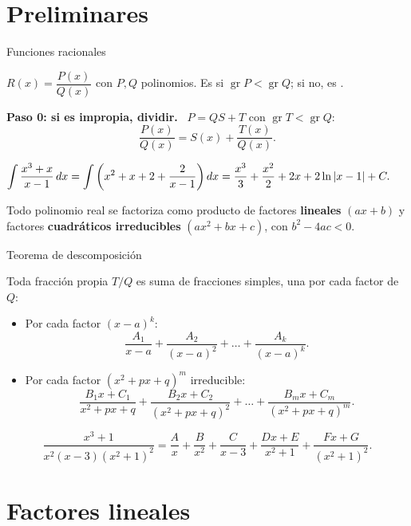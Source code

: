 \documentclass[10pt,aspectratio=169]{beamer}
\begin{document}
\section{Preliminares}

\begin{frame}{Funciones racionales}
  \begin{definicion}
    $R(x)=\dfrac{P(x)}{Q(x)}$ con $P,Q$ polinomios. Es  si $\operatorname{gr}P<\operatorname{gr}Q$; si no, es .
  \end{definicion}
  \textbf{Paso 0: si es impropia, dividir.} \ $P=QS+T$ con $\operatorname{gr}T<\operatorname{gr}Q$:
  \[ \frac{P(x)}{Q(x)}=S(x)+\frac{T(x)}{Q(x)}. \]
  \begin{ejemplo}[1]
    $\displaystyle\int\frac{x^3+x}{x-1}\,dx=\int\left(x^2+x+2+\frac{2}{x-1}\right)dx=\frac{x^3}{3}+\frac{x^2}{2}+2x+2\ln|x-1|+C.$
  \end{ejemplo}
  \begin{teorema}[factorización en $\R$]
    Todo polinomio real se factoriza como producto de factores \textbf{lineales} $(ax+b)$ y factores \textbf{cuadráticos
    irreducibles} $(ax^2+bx+c)$, con $b^2-4ac<0$.
  \end{teorema}
\end{frame}

\begin{frame}{Teorema de descomposición}
  \begin{teorema}
    Toda fracción propia $T/Q$ es suma de fracciones simples, una por cada factor de $Q$:
    \begin{itemize}
      \item Por cada factor $(x-a)^k$:
        \[ \frac{A_1}{x-a}+\frac{A_2}{(x-a)^2}+\dots+\frac{A_k}{(x-a)^k}. \]
      \item Por cada factor $(x^2+px+q)^m$ irreducible:
        \[ \frac{B_1x+C_1}{x^2+px+q}+\frac{B_2x+C_2}{(x^2+px+q)^2}+\dots+\frac{B_mx+C_m}{(x^2+px+q)^m}. \]
    \end{itemize}
  \end{teorema}
  \begin{ejemplo}
    \[ \frac{x^3+1}{x^2(x-3)(x^2+1)^2}=\frac Ax+\frac B{x^2}+\frac C{x-3}+\frac{Dx+E}{x^2+1}+\frac{Fx+G}{(x^2+1)^2}. \]
  \end{ejemplo}
\end{frame}

\section{Factores lineales}
\end{document}
